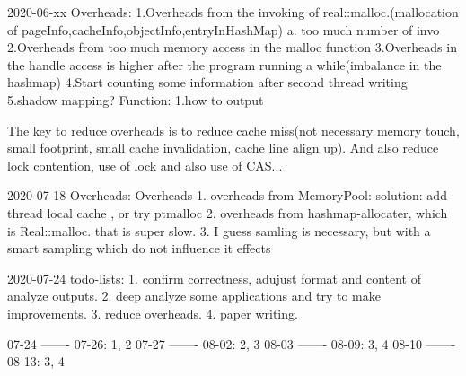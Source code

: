 2020-06-xx
Overheads:
1.Overheads from the invoking of real::malloc.(mallocation of pageInfo,cacheInfo,objectInfo,entryInHashMap)
a. too much number of invo
2.Overheads from too much memory access in the malloc function
3.Overheads in the handle access is higher after the program running a while(imbalance in the hashmap)
4.Start counting some information after second thread writing
5.shadow mapping?
Function:
1.how to output

The key to reduce overheads is to reduce cache miss(not necessary memory touch, small footprint, small cache invalidation, cache line align up).
And also reduce lock contention, use of lock and also use of CAS...


2020-07-18 Overheads:
Overheads
1. overheads from MemoryPool:
solution: add thread local cache , or try ptmalloc
2. overheads from hashmap-allocater, which is Real::malloc. that is super slow.
3. I guess samling is necessary, but with a smart sampling which do not influence it effects




2020-07-24 todo-lists:
1. confirm correctness, adujust format and content of analyze outputs.
2. deep analyze some applications and try to make improvements.
3. reduce overheads.
4. paper writing.

07-24 ------- 07-26: 1, 2
07-27 ------- 08-02: 2, 3
08-03 ------- 08-09: 3, 4
08-10 ------- 08-13: 3, 4

